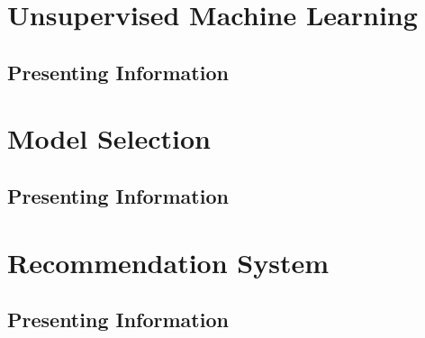 \documentclass[11pt,fleqn]{book} %
\begin{document}
%


\part{Unsupervised Machine Learning}


\chapter{Presenting Information}

%


\part{Model Selection}


\chapter{Presenting Information}

%


\part{Recommendation System}


\chapter{Presenting Information}

%
\end{document}
